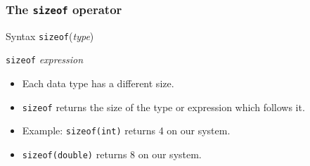 \documentclass{beamer}
\begin{document}
\begin{frame}
    \frametitle{The {\tt sizeof} operator}
    \begin{block}{Syntax}
        {\tt sizeof}({\em type})\par
        {\tt sizeof} {\em expression}
    \end{block}
    \begin{itemize}
        \item Each data type has a different size.
        \item {\tt sizeof} returns the size of the type or expression 
            which follows it.
        \item Example: {\tt sizeof(int)} returns 4 on our system.
        \item {\tt sizeof(double)} returns 8 on our system.
    \end{itemize}
\end{frame}
\end{document}
